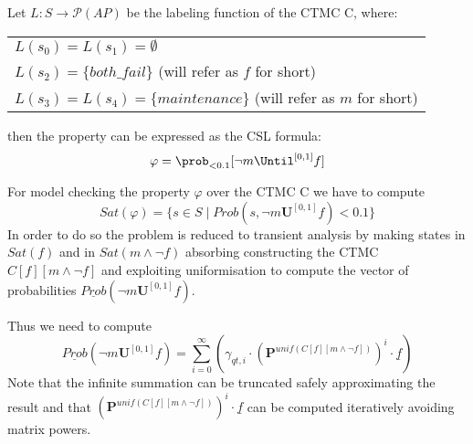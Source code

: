 \subsection{}

Let $L:S \to \mathscr{P}(AP)$ be the labeling function of the CTMC C, where:
\begin{center}
	\begin{tabular}{l}
		$L(s_0) = L(s_1) = \emptyset$                                     \\
		$L(s_2) = \{both\_fail\}$ (will refer as $f$ for short)           \\
		$L(s_3) = L(s_4) = \{maintenance\}$ (will refer as $m$ for short) \\
	\end{tabular}
\end{center}
then the property can be expressed as the CSL formula:
\[
	\varphi = \prob_{<0.1}[ \neg m \Until^{[0, 1]} f ]
\]

For model checking the property $\varphi$ over the CTMC C we have to compute
\[
	Sat(\varphi) = \{s \in S \mid Prob(s, \neg m \mathbf{U}^{[0, 1]} f) < 0.1 \}
\]
In order to do so the problem is reduced to transient analysis by making
states in $Sat(f)$ and in $Sat(m \wedge \neg f)$ absorbing constructing the
CTMC $C[f][m \wedge \neg f]$ and exploiting uniformisation to compute the
vector of probabilities $\underline{Prob}(\neg m \mathbf{U}^{[0, 1]} f) $.

Thus we need to compute
\[
	\underline{Prob}(\neg m \mathbf{U}^{[0, 1]} f) = \sum_{i=0}^\infty \left( \gamma_{qt, i}\cdot(\mathbf{P}^{unif(C[f][m \wedge \neg f])})^i\cdot \underline{f} \right)
\]
Note that the infinite summation can be truncated safely approximating the
result and that
$(\mathbf{P}^{unif(C[f][m \wedge \neg f])})^i\cdot \underline{f}$ can be
computed iteratively avoiding matrix powers.
